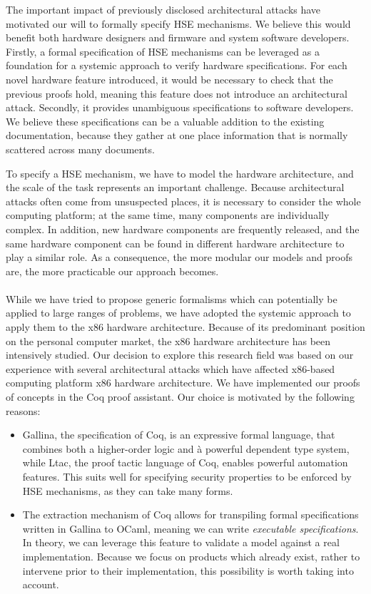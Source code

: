 The important impact of previously disclosed architectural attacks have
motivated our will to formally specify HSE mechanisms.
%
We believe this would benefit both hardware designers and firmware and system
software developers.
%
Firstly, a formal specification of HSE mechanisms can be leveraged as a
foundation for a systemic approach to verify hardware specifications.
%
For each novel hardware feature introduced, it would be necessary to check that
the previous proofs hold, meaning this feature does not introduce an
architectural attack.
%
Secondly, it provides unambiguous specifications to software developers.
%
We believe these specifications can be a valuable addition to the existing
documentation, because they gather at one place information that is normally
scattered across many documents.

To specify a HSE mechanism, we have to model the hardware architecture, and the
scale of the task represents an important challenge.
%
Because architectural attacks often come from unsuspected places, it is
necessary to consider the whole computing platform; at the same time, many
components are individually complex.
%
In addition, new hardware components are frequently released, and the same
hardware component can be found in different hardware architecture to play a
similar role.
%
As a consequence, the more modular our models and proofs are, the more
practicable our approach becomes.

\paragraph{}
%
While we have tried to propose generic formalisms which can potentially be
applied to large ranges of problems, we have adopted the systemic approach to
apply them to the x86 hardware architecture.
%
Because of its predominant position on the personal computer market, the x86
hardware architecture has been intensively studied.
%
Our decision to explore this research field was based on our experience with
several architectural attacks which have affected x86-based computing platform
x86 hardware architecture.
%
We have implemented our proofs of concepts in the Coq proof assistant.
%
Our choice is motivated by the following reasons:
%
\begin{itemize}
\item {\sc Gallina}, the specification of Coq, is an expressive formal language,
  that combines both a higher-order logic and à powerful dependent type system,
  while {\sc Ltac}, the proof tactic language of Coq, enables powerful
  automation features.
  This suits well for specifying security properties to be enforced by HSE
  mechanisms, as they can take many forms.
\item The extraction mechanism of Coq allows for transpiling formal
  specifications written in {\sc Gallina} to OCaml, meaning we can write
  \emph{executable specifications}.
  In theory, we can leverage this feature to validate a model against a real
  implementation.
  Because we focus on products which already exist, rather to intervene prior to
  their implementation, this possibility is worth taking into account.
\end{itemize}

